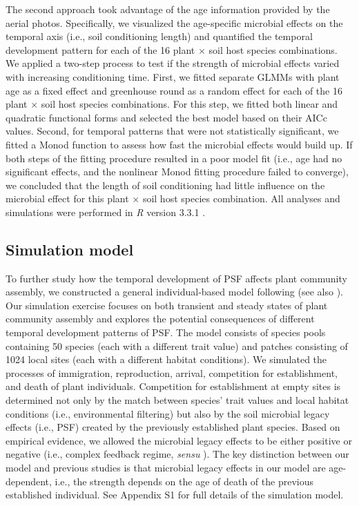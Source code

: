  
The second approach took advantage of the age information provided by the aerial photos. Specifically, we visualized the age-specific microbial effects on the temporal axis (i.e., soil conditioning length) and quantified the temporal development pattern for each of the 16 plant $\times$ soil host species combinations.
We applied a two-step process to test if the strength of microbial effects varied with increasing conditioning time. First, we fitted separate GLMMs with plant age as a fixed effect and greenhouse round as a random effect for each of the 16 plant $\times$ soil host species combinations. For this step, we fitted both linear and quadratic functional forms and selected the best model based on their AICc values. 
Second, for temporal patterns that were not statistically significant, we fitted a Monod function to assess how fast the microbial effects would build up. If both steps of the fitting procedure resulted in a poor model fit (i.e., age had no significant effects, and the nonlinear Monod fitting procedure failed to converge), we concluded that the length of soil conditioning had little influence on the microbial effect for this plant $\times$ soil host species combination. All analyses and simulations were performed in \textit{R} version 3.3.1 \citep{R}. 
\par



\subsection*{Simulation model}
To further study how the temporal development of PSF affects plant community assembly, we constructed a general individual-based model following \citet{FukamiNakajima2011} (see also \citealp{Fukami2013, ZeeFukami2015, Fukami2017}). 
Our simulation exercise focuses on both transient and steady states of plant community assembly and explores the potential consequences of different temporal development patterns of PSF.
The model consists of species pools containing 50 species (each with a different trait value) and patches consisting of 1024 local sites (each with a different habitat conditions). We simulated the processes of immigration, reproduction, arrival, competition for establishment, and death of plant individuals. 
Competition for establishment at empty sites is determined not only by the match between species' trait values and local habitat conditions (i.e., environmental filtering) but also by the soil microbial legacy effects (i.e., PSF) created by the previously established plant species. 
Based on empirical evidence, we allowed the microbial legacy effects to be either positive or negative (i.e., complex feedback regime, \textit{sensu} \citealp{Fukami2013}).
The key distinction between our model and previous studies is that microbial legacy effects in our model are age-dependent, i.e., the strength depends on the age of death of the previous established individual. See Appendix S1 for full details of the simulation model.
\par


